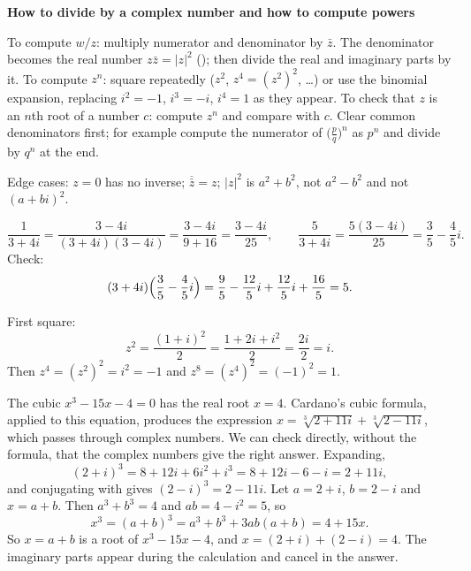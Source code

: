 \documentclass[10pt]{scrartcl}
\newenvironment{methodbox}[1]{\begin{mdframed}[style=methodstyle]\textbf{\color{NavyBlue}#1}\par\vspace{2pt}}{\end{mdframed}}
\begin{document}
\begin{methodbox}{How to divide by a complex number and how to compute powers}
  \begin{steps}
    \ii To compute $w/z$: multiply numerator and denominator by $\bar z$. The denominator becomes the real number $z\bar z=|z|^2$ (); then divide the real and imaginary parts by it.
    \ii To compute $z^n$: square repeatedly ($z^2$, $z^4=(z^2)^2$, \dots) or use the binomial expansion, replacing $i^2=-1$, $i^3=-i$, $i^4=1$ as they appear.
    \ii To check that $z$ is an $n$th root of a number $c$: compute $z^n$ and compare with $c$. Clear common denominators first; for example compute the numerator of $\bigl(\frac{p}{q}\bigr)^n$ as $p^n$ and divide by $q^n$ at the end.
  \end{steps}
  Edge cases: $z=0$ has no inverse; $\overline{\bar z}=z$; $|z|^2$ is $a^2+b^2$, not $a^2-b^2$ and not $(a+bi)^2$.
\end{methodbox}

\begin{example*}
  \[
    \frac{1}{3+4i}=\frac{3-4i}{(3+4i)(3-4i)}=\frac{3-4i}{9+16}=\frac{3-4i}{25},\qquad
    \frac{5}{3+4i}=\frac{5(3-4i)}{25}=\frac{3}{5}-\frac{4}{5}i.
  \]
  Check:
  \[
    (3+4i)\Bigl(\frac35-\frac45i\Bigr)=\frac95-\frac{12}5i+\frac{12}5i+\frac{16}5=5.
  \]
\end{example*}

\begin{example*}[Powers by repeated squaring: $z=(1+i)/\sqrt2$ satisfies $z^8=1$]
  First square:
  \[
    z^2=\frac{(1+i)^2}{2}=\frac{1+2i+i^2}{2}=\frac{2i}{2}=i.
  \]
  Then $z^4=(z^2)^2=i^2=-1$ and $z^8=(z^4)^2=(-1)^2=1$.
\end{example*}

\begin{example*}
  The cubic $x^3-15x-4=0$ has the real root $x=4$. Cardano's cubic formula, applied to this equation, produces the expression $x=\sqrt[3]{2+11i}+\sqrt[3]{2-11i}$, which passes through complex numbers. We can check directly, without the formula, that the complex numbers give the right answer. Expanding,
  \[
    (2+i)^3=8+12i+6i^2+i^3=8+12i-6-i=2+11i,
  \]
  and conjugating with  gives $(2-i)^3=2-11i$. Let $a=2+i$, $b=2-i$ and $x=a+b$. Then $a^3+b^3=4$ and $ab=4-i^2=5$, so
  \[
    x^3=(a+b)^3=a^3+b^3+3ab(a+b)=4+15x .
  \]
  So $x=a+b$ is a root of $x^3-15x-4$, and $x=(2+i)+(2-i)=4$. The imaginary parts appear during the calculation and cancel in the answer.
\end{example*}
\end{document}
